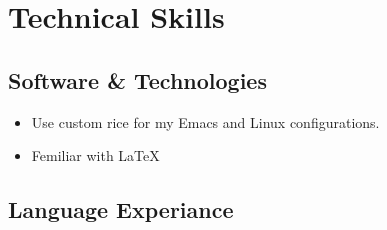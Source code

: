\section*{Technical Skills}

\subsection*{Software \& Technologies}
\begin{itemize}
    \item Use custom rice for my Emacs and Linux configurations.
    \item Femiliar with \LaTeX
\end{itemize}

\subsection*{Language Experiance}
